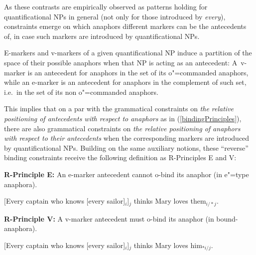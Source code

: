 \documentclass[output=paper
,modfonts
,nonflat]{langsci/langscibook}
\begin{document}
\begin{exe}
\ex\label{weakcrossover}
\begin{xlist}
\label{weakcrossovera}
\label{weakcrossoverb}
\end{xlist}
\end{exe}

As these contrasts are empirically observed as patterns holding for quantificational NPs
in general (not only for those introduced by \emph{every}), 
constraints emerge on which anaphors different markers can be the antecedents 
of, in case such markers are introduced by quantificational NPs.

E-markers and v-markers of a given quantificational NP induce a partition of the
space of their possible anaphors when that NP is acting as an
antecedent:  A~\mbox{v-marker}
is an antecedent for anaphors in the set of its o"=commanded anaphors, while  
an e-marker is an antecedent for anaphors in the complement of such set, i.e.\ in 
the set of its non o"=commanded anaphors.

This implies that on a par with the grammatical constraints on \emph{the relative
positioning of antecedents with respect to anaphors} as in (\ref{bindingPrinciples}), 
there are also grammatical constraints on \emph{the relative positioning 
of anaphors with respect to their antecedents} when
the corresponding markers are introduced by quantificational NPs. 
Building on the same auxiliary notions, these ``reverse'' binding
constraints receive the following definition as R-Principles E and V:


\begin{exe}
\ex\label{reverseBindingPrinciples}
{\textbf{R-Principle E:}} An e-marker antecedent cannot o-bind its anaphor (in e"=type anaphora).

\sn
{$[$Every captain who knows [every sailor]$_{i}$]$_{j}$ thinks Mary loves them$_{i/*j}$.}
\end{exe}


\begin{exe}
\sn
{\textbf{R-Principle V:}} A v-marker antecedent must o-bind its anaphor (in bound-anaphora).

\sn
{$[$Every captain who knows [every sailor]$_{i}$]$_{j}$ thinks Mary loves him$_{*i/j}$.}
\end{exe}
\end{document}
